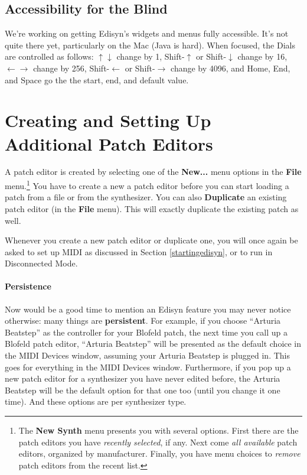 \documentclass{article}
\begin{document}
\subsection{Accessibility for the Blind} We're working on getting Edisyn's widgets and menus fully accessible.  It's not quite there yet, particularly on the Mac (Java is hard).  When focused, the Dials are controlled as follows:  \(\uparrow \downarrow\) change by 1, Shift-\(\uparrow\) or Shift-\(\downarrow\) change by 16, \(\leftarrow \rightarrow\) change by 256, Shift-\(\leftarrow\) or Shift-\(\rightarrow\) change by 4096, and Home, End, and Space go the the start, end, and default value.  %

\section{Creating and Setting Up Additional Patch Editors}

A patch editor is created by selecting one of the {\bf New...} menu options in the {\bf File} menu.\footnote{The {\bf New Synth} menu presents you with several options.  First there are the patch editors you have {\it recently selected}, if any.  Next come {\it all available} patch editors, organized by manufacturer.  Finally, you have menu choices to {\it remove} patch editors from the recent list.}   You have to create a new a patch editor before you can start loading a patch from a file or from the synthesizer.  You can also {\bf Duplicate} an existing patch editor (in the {\bf File} menu).  This will exactly duplicate the existing patch as well.  

Whenever you create a new patch editor or duplicate one, you will once again be asked to set up MIDI as discussed in Section \ref{startingedisyn}, or to run in Disconnected Mode.

\paragraph{Persistence}
Now would be a good time to mention an Edisyn feature you may never notice otherwise: many things are {\bf persistent}.  For example, if you choose ``Arturia Beatstep'' as the controller for your Blofeld patch, the next time you call up a Blofeld patch editor, ``Arturia Beatstep'' will be presented as the default choice in the MIDI Devices window, assuming your Arturia Beatstep is plugged in.  This goes for everything in the MIDI Devices window.  Furthermore, if you pop up a new patch editor for a synthesizer you have never edited before, the Arturia Beatstep will be the default option for that one too (until you change it one time).    And these options are per synthesizer type.
\end{document}
